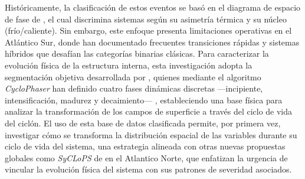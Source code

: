 Históricamente, la clasificación de estos eventos se basó en el diagrama de espacio de fase de \citet{hart2003cyclone}, el cual discrimina sistemas según su asimetría térmica y su núcleo (frío/caliente). Sin embargo, este enfoque presenta limitaciones operativas en el Atlántico Sur, donde \citet{reboita2022from} han documentado frecuentes transiciones rápidas y sistemas híbridos que desafían las categorías binarias clásicas. Para caracterizar la evolución física de la estructura interna, esta investigación adopta la segmentación objetiva desarrollada por \citet{coutodesouza2024new}, quienes mediante el algoritmo \textit{CycloPhaser} han definido cuatro fases dinámicas discretas —incipiente, intensificación, madurez y decaimiento— \citep{deSouza2025CycloPhaser}, estableciendo una base física para analizar la transformación de los campos de superficie a través del ciclo de vida del ciclón.
%
El uso de esta base de datos clasificada permite, por primera vez, investigar cómo se transforma la distribución espacial de las variables durante su ciclo de vida del sistema, una estrategia alineada con otras nuevas propuestas globales como \textit{SyCLoPS} de \citet{han2025system} en el Atlantico Norte, que enfatizan la urgencia de vincular la evolución física del sistema con sus patrones de severidad asociados.



%
